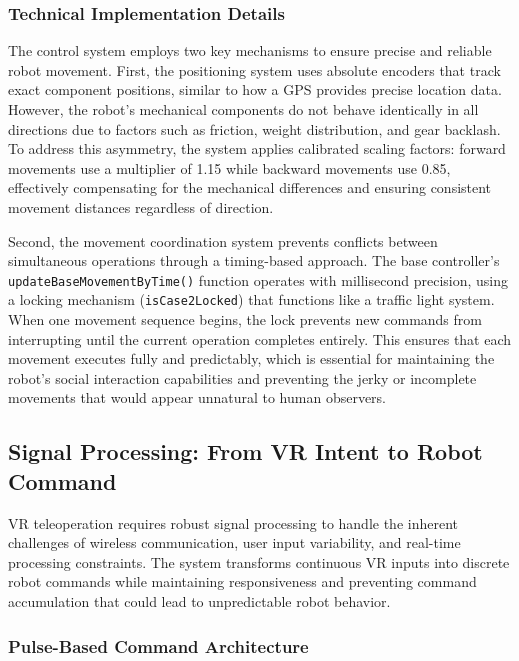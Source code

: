 \subsubsection{Technical Implementation Details}

The control system employs two key mechanisms to ensure precise and reliable robot movement. First, the positioning system uses absolute encoders that track exact component positions, similar to how a GPS provides precise location data. However, the robot's mechanical components do not behave identically in all directions due to factors such as friction, weight distribution, and gear backlash. To address this asymmetry, the system applies calibrated scaling factors: forward movements use a multiplier of 1.15 while backward movements use 0.85, effectively compensating for the mechanical differences and ensuring consistent movement distances regardless of direction.

Second, the movement coordination system prevents conflicts between simultaneous operations through a timing-based approach. The base controller's \texttt{updateBaseMovementByTime()} function operates with millisecond precision, using a locking mechanism (\texttt{isCase2Locked}) that functions like a traffic light system. When one movement sequence begins, the lock prevents new commands from interrupting until the current operation completes entirely. This ensures that each movement executes fully and predictably, which is essential for maintaining the robot's social interaction capabilities and preventing the jerky or incomplete movements that would appear unnatural to human observers.

\subsection{Signal Processing: From VR Intent to Robot Command}

VR teleoperation requires robust signal processing to handle the inherent challenges of wireless communication, user input variability, and real-time processing constraints. The system transforms continuous VR inputs into discrete robot commands while maintaining responsiveness and preventing command accumulation that could lead to unpredictable robot behavior.

\subsubsection{Pulse-Based Command Architecture}

